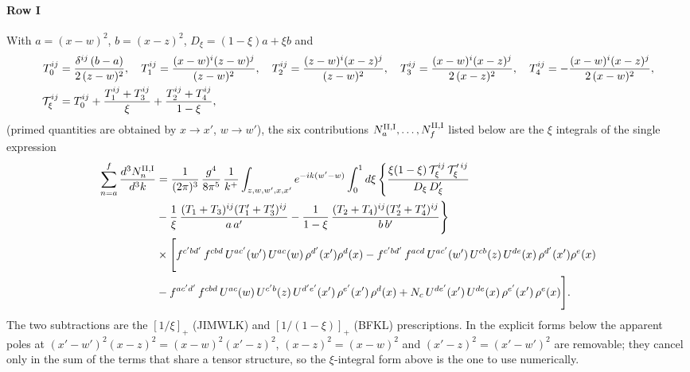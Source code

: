 \documentclass[9pt]{article}
\numberwithin{equation}{section}
\begin{document}
\paragraph{Row I}
With $a=(x-w)^{2}$, $b=(x-z)^{2}$, $D_{\xi}=(1-\xi)a+\xi b$ and
\begin{align}
T_{0}^{ij}&=\frac{\delta^{ij}\,(b-a)}{2\,(z-w)^{2}},\quad
T_{1}^{ij}=\frac{(x-w)^{i}(z-w)^{j}}{(z-w)^{2}},\quad
T_{2}^{ij}=\frac{(z-w)^{i}(x-z)^{j}}{(z-w)^{2}},\quad
T_{3}^{ij}=\frac{(x-w)^{i}(x-z)^{j}}{2\,(x-z)^{2}},\quad
T_{4}^{ij}=-\frac{(x-w)^{i}(x-z)^{j}}{2\,(x-w)^{2}},\notag\\
\mathcal{T}_{\xi}^{ij}&=T_{0}^{ij}+\frac{T_{1}^{ij}+T_{3}^{ij}}{\xi}+\frac{T_{2}^{ij}+T_{4}^{ij}}{1-\xi},
\end{align}
(primed quantities are obtained by $x\to x'$, $w\to w'$), the six contributions $N^{\rm II,I}_{a},\dots,N^{\rm II,I}_{f}$ listed below are the $\xi$ integrals of the single expression
\begin{align}
\sum_{n=a}^{f}\frac{d^{3}N^{\rm II,I}_{n}}{d^{3}k}&=\frac{1}{(2\pi)^{3}}\,\frac{g^{4}}{8\pi^{5}}\,\frac{1}{k^{+}}\int_{z,w,w',x,x'}e^{-ik(w'-w)}\int_{0}^{1}d\xi\,\Bigg\{\frac{\xi(1-\xi)\,\mathcal{T}_{\xi}^{ij}\,\mathcal{T}_{\xi}^{\prime\,ij}}{D_{\xi}\,D'_{\xi}}\notag\\
&-\frac{1}{\xi}\,\frac{(T_{1}+T_{3})^{ij}(T'_{1}+T'_{3})^{ij}}{a\,a'}
-\frac{1}{1-\xi}\,\frac{(T_{2}+T_{4})^{ij}(T'_{2}+T'_{4})^{ij}}{b\,b'}\Bigg\}\notag\\
&\times\Bigg[f^{c'bd'}\,f^{cbd}\, U^{ac'}(w')\,U^{ac}(w)\,\rho^{d'}(x')\rho^{d}(x)- f^{c'bd'}\,f^{acd}\,U^{ac'}(w')\,U^{cb}(z)\,U^{de}(x)\,\rho^{d'}(x')\rho^{e}(x) \notag \\ & -f^{ac'd'}\,f^{cbd}\,U^{ac}(w)\,U^{c'b}(z)\,U^{d'e'}(x')\,\rho^{e'}(x')\,\rho^{d}(x) +N_{c}\,U^{de'}(x')\,U^{de}(x)\,\rho^{e'}(x')\,\rho^{e}(x)\Bigg].
\end{align}
The two subtractions are the $[1/\xi]_{+}$ (JIMWLK) and $[1/(1-\xi)]_{+}$ (BFKL) prescriptions. In the explicit forms below the apparent poles at $(x'-w')^{2}(x-z)^{2}=(x-w)^{2}(x'-z)^{2}$, $(x-z)^{2}=(x-w)^{2}$ and $(x'-z)^{2}=(x'-w')^{2}$ are removable; they cancel only in the sum of the terms that share a tensor structure, so the $\xi$-integral form above is the one to use numerically.
\end{document}
